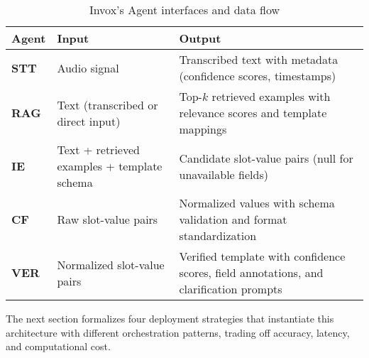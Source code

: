 \begin{table}[h]
\centering
\begin{tabular}{p{2.5cm}p{5cm}p{5.5cm}}
\toprule
\textbf{Agent} & \textbf{Input} & \textbf{Output} \\
\midrule
\textbf{STT} & Audio signal & Transcribed text with metadata (confidence scores, timestamps) \\
\midrule
\textbf{RAG} & Text (transcribed or direct input) & Top-$k$ retrieved examples with relevance scores and template mappings \\
\midrule
\textbf{IE} & Text + retrieved examples + template schema & Candidate slot-value pairs (null for unavailable fields) \\
\midrule
\textbf{CF} & Raw slot-value pairs & Normalized values with schema validation and format standardization \\
\midrule
\textbf{VER} & Normalized slot-value pairs & Verified template with confidence scores, field annotations, and clarification prompts \\
\bottomrule
\end{tabular}
\caption{Invox's Agent interfaces and data flow}
\label{tab:agent-interfaces}
\end{table}

The next section formalizes four deployment strategies that instantiate this architecture with different orchestration patterns, trading off accuracy, latency, and computational cost.

